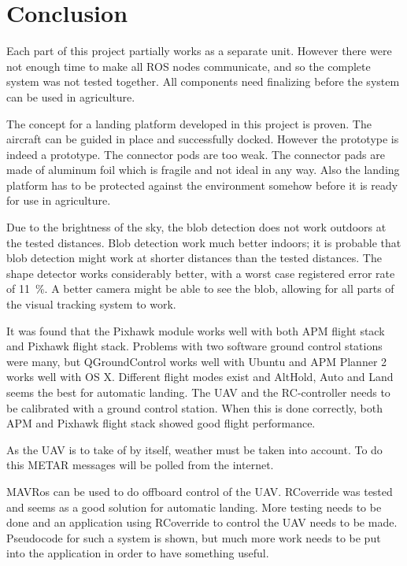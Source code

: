 \section{Conclusion}
Each part of this project partially works as a separate unit. However there were not enough time to make all ROS nodes communicate, and so the complete system was not tested together. All components need finalizing before the system can be used in agriculture.

The concept for a landing platform developed in this project is proven. The aircraft can be guided in place and successfully docked. However the prototype is indeed a prototype. The connector pods are too weak. The connector pads are made of aluminum foil which is fragile and not ideal in any way. Also the landing platform has to be protected against the environment somehow before it is ready for use in agriculture. 

Due to the brightness of the sky, the blob detection does not work outdoors at the tested distances. Blob detection work much better indoors; it is probable that blob detection might work at shorter distances than the tested distances. The shape detector works considerably better, with a worst case registered error rate of \SI{11}{\percent}. A better camera might be able to see the blob, allowing for all parts of the visual tracking system to work.

It was found that the Pixhawk module works well with both APM flight stack and Pixhawk flight stack. Problems with two software ground control stations were many, but QGroundControl works well with Ubuntu and APM Planner 2 works well with OS X. Different flight modes exist and AltHold, Auto and Land seems the best for automatic landing. The UAV and the RC-controller needs to be calibrated with a ground control station. When this is done correctly, both APM and Pixhawk flight stack showed good flight performance.

As the UAV is to take of by itself, weather must be taken into account. To do this METAR messages will be polled from the internet. 

MAVRos can be used to do offboard control of the UAV. RCoverride was tested and seems as a good solution for automatic landing. More testing needs to be done and an application using RCoverride to control the UAV needs to be made. Pseudocode for such a system is shown, but much more work needs to be put into the application in order to have something useful. 